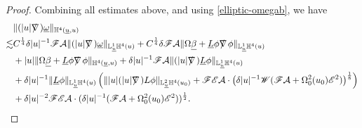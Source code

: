 \documentclass[11pt,reqno]{amsart}
\theoremstyle{definition}
\numberwithin{equation}{section}
\renewcommand{\L}{\mathbb{L}}
\renewcommand{\H}{\mathbb{H}}
\def\betab{\underline{\beta}}
\def\Lb{\underline{L}}
\def\omegab{\underline{\omega}}
\def\ub{\underline{u}}
\def\nablas{\mbox{$\nabla \mkern -13mu /$ }}
\begin{document}
\begin{proof}
Combining all estimates above, and using \eqref{elliptic-omegab}, we have
\begin{equation}\label{estimate-omegab-step1}
\begin{split}
&\|(|u|\nablas)\omegab\|_{\H^4(\ub,u)}\\
\lesssim&C^{\frac{1}{4}}\delta|u|^{-1}\mathscr{F}\mathcal{A}\|(|u|\nablas)\omegab\|_{\L^1_{\ub}\H^4(u)}+C^{\frac{1}{4}}\delta\mathscr{F}\mathcal{A}\|\Omega\betab+\Lb\phi\nablas\phi\|_{\L^1_{\ub}\H^4(u)}\\
&+|u|\|\Omega\betab+\Lb\phi\nablas\phi\|_{\H^4(\ub,u)}+\delta|u|^{-1}\mathscr{F}\mathcal{A}\|(|u|\nablas)\Lb\phi\|_{\L^1_{\ub}\H^4(u)}\\
&+\delta|u|^{-1}\|\Lb\phi\|_{\L^1_{\ub}\H^4(u)}\left(\||u|(|u|\nablas)L\phi\|_{\L^2_{\ub}\H^4(u_0)}+\mathscr{F}\mathscr{E}\mathcal{A}\cdot\left(\delta|u|^{-1}\mathscr{W}(\mathscr{F}\mathcal{A}+\Omega_0^2(u_0)\mathscr{E}^2)\right)^{\frac{1}{8}}\right)\\
&+\delta|u|^{-2}\mathscr{F}\mathscr{E}\mathcal{A}\cdot(\delta|u|^{-1}(\mathscr{F}\mathcal{A}+\Omega_0^2(u_0)\mathscr{E}^2))^{\frac{1}{2}}.
\end{split}
\end{equation}


\end{proof}
\end{document}
